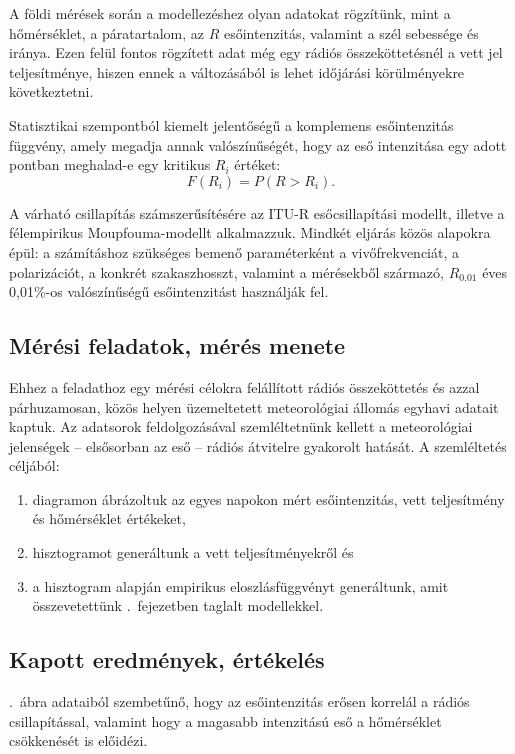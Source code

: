 \documentclass{article}
\begin{document}
A földi mérések során a modellezéshez olyan adatokat rögzítünk, mint a hőmérséklet, a páratartalom, az $R$ esőintenzitás, valamint a szél sebessége és iránya. Ezen felül fontos rögzített adat még egy rádiós összeköttetésnél a vett jel teljesítménye, hiszen ennek a változásából is lehet időjárási körülményekre következtetni.

Statisztikai szempontból kiemelt jelentőségű a komplemens esőintenzitás függvény, amely megadja annak valószínűségét, hogy az eső intenzitása egy adott pontban meghalad-e egy kritikus $R_i$ értéket: $$F(R_i) = P(R > R_i).$$

A várható csillapítás számszerűsítésére az ITU-R esőcsillapítási modellt, illetve a félempirikus Moupfouma-modellt alkalmazzuk. Mindkét eljárás közös alapokra épül: a számításhoz szükséges bemenő paraméterként a vivőfrekvenciát, a polarizációt, a konkrét szakaszhosszt, valamint a mérésekből származó, $R_{0.01}$ éves 0,01\%-os valószínűségű esőintenzitást használják fel.

\subsection{Mérési feladatok, mérés menete}

Ehhez a feladathoz egy mérési célokra felállított rádiós összeköttetés és azzal párhuzamosan, közös helyen üzemeltetett meteorológiai állomás egyhavi adatait kaptuk. Az adatsorok feldolgozásával szemléltetnünk kellett a meteorológiai jelenségek -- elsősorban az eső -- rádiós átvitelre gyakorolt hatását. A szemléltetés céljából:
\begin{enumerate}
    \item diagramon ábrázoltuk az egyes napokon mért esőintenzitás, vett teljesítmény és hőmérséklet értékeket,
    \item hisztogramot generáltunk a vett teljesítményekről és
    \item a hisztogram alapján empirikus eloszlásfüggvényt generáltunk, amit összevetettünk .~fejezetben taglalt modellekkel.
\end{enumerate}
\subsection{Kapott eredmények, értékelés}

.~ábra adataiból szembetűnő, hogy az esőintenzitás erősen korrelál a rádiós csillapítással, valamint hogy a magasabb intenzitású eső a hőmérséklet csökkenését is előidézi.
\end{document}
